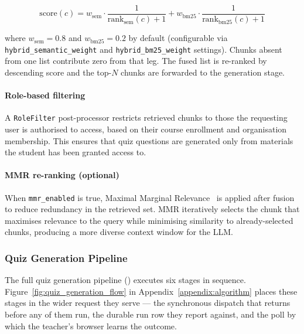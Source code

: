 \begin{equation}
    \text{score}(c) = w_{\text{sem}} \cdot \frac{1}{\text{rank}_{\text{sem}}(c) + 1} + w_{\text{bm25}} \cdot \frac{1}{\text{rank}_{\text{bm25}}(c) + 1}
\end{equation}

where $w_{\text{sem}} = 0.8$ and $w_{\text{bm25}} = 0.2$ by default (configurable via \texttt{hybrid\_semantic\_weight} and \texttt{hybrid\_bm25\_weight} settings). Chunks absent from one list contribute zero from that leg. The fused list is re-ranked by descending score and the top-$N$ chunks are forwarded to the generation stage.

\paragraph{Role-based filtering}
A \texttt{RoleFilter} post-processor restricts retrieved chunks to those the requesting user is authorised to access, based on their course enrollment and organisation membership. This ensures that quiz questions are generated only from materials the student has been granted access to.

\paragraph{MMR re-ranking (optional)}
When \texttt{mmr\_enabled} is true, Maximal Marginal Relevance~\cite{carbonell1998mmr} is applied after fusion to reduce redundancy in the retrieved set. MMR iteratively selects the chunk that maximises relevance to the query while minimising similarity to already-selected chunks, producing a more diverse context window for the LLM.

\subsubsection{Quiz Generation Pipeline}
\label{sec:impl_quiz_pipeline}

The full quiz generation pipeline () executes six stages in sequence. Figure~\ref{fig:quiz_generation_flow} in Appendix~\ref{appendix:algorithm} places these stages in the wider request they serve --- the synchronous dispatch that returns before any of them run, the durable run row they report against, and the poll by which the teacher's browser learns the outcome.

